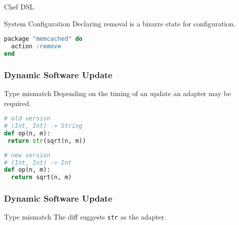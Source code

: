 \documentclass{beamer}
\begin{document}
\begin{frame}[fragile]{Chef DSL}
  \begin{block}{System Configuration}
    Declaring removal is a bizarre state for configuration.
  \end{block}

  \begin{example}
    \begin{lstlisting}[language=ruby]
package "memcached" do
  action :remove
end
    \end{lstlisting}
  \end{example}
\end{frame}


\begin{frame}[fragile]
  \frametitle{Dynamic Software Update}
  \begin{block}{Type mismatch}
    Depending on the timing of an update an adapter may be required.
  \end{block}

  \begin{example}
    \begin{center}
      \begin{minipage}{.54\textwidth}
        \begin{lstlisting}[language=python]
# old version
# (Int, Int) -> String
def op(n, m):
 return str(sqrt(n, m))
        \end{lstlisting}
      \end{minipage}
      \hfill
      \begin{minipage}{.45\textwidth}
        \begin{lstlisting}[language=python]
# new version
# (Int, Int) -> Int
def op(n, m):
  return sqrt(n, m)
        \end{lstlisting}
      \end{minipage}
    \end{center}
  \end{example}
\end{frame}

\begin{frame}[fragile]
  \frametitle{Dynamic Software Update}
  \begin{block}{Type mismatch}
    The diff suggests \verb|str| as the adapter.
  \end{block}

  \begin{example}
    
  \end{example}
\end{frame}
\end{document}
